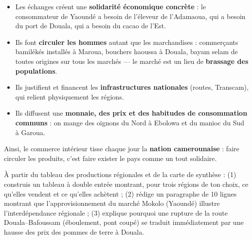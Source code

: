 \documentclass[11pt]{article}
\begin{document}
\begin{aretenir}
\begin{itemize}
\item Les échanges créent une \textbf{solidarité économique concrète} : le consommateur de Yaoundé a besoin de l'éleveur de l'Adamaoua, qui a besoin du port de Douala, qui a besoin du cacao de l'Est.
\item Ils font \textbf{circuler les hommes} autant que les marchandises : commerçants bamilékés installés à Maroua, bouchers haoussa à Douala, bayam selam de toutes origines sur tous les marchés — le marché est un lieu de \textbf{brassage des populations}.
\item Ils justifient et financent les \textbf{infrastructures nationales} (routes, Transcam), qui relient physiquement les régions.
\item Ils diffusent une \textbf{monnaie, des prix et des habitudes de consommation communs} : on mange des oignons du Nord à Ebolowa et du manioc du Sud à Garoua.
\end{itemize}
Ainsi, le commerce intérieur tisse chaque jour la \textbf{nation camerounaise} : faire circuler les produits, c'est faire exister le pays comme un tout solidaire.
\end{aretenir}

\begin{exercice}
À partir du tableau des productions régionales et de la carte de synthèse : (1) construis un tableau à double entrée montrant, pour trois régions de ton choix, ce qu'elles vendent et ce qu'elles achètent ; (2) rédige un paragraphe de 10 lignes montrant que l'approvisionnement du marché Mokolo (Yaoundé) illustre l'interdépendance régionale ; (3) explique pourquoi une rupture de la route Douala--Bafoussam (éboulement, pont coupé) se traduit immédiatement par une hausse des prix des pommes de terre à Douala.
\end{exercice}
\end{document}
